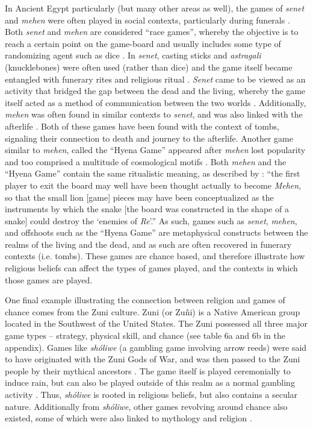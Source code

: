 \documentclass[%
	]{ijsra}
\begin{document}
In Ancient Egypt particularly (but many other areas as well), the games of \textit{senet} and \textit{mehen} were often played in social contexts, particularly during funerals \parencite[34]{kendall2007}. Both \textit{senet} and \textit{mehen} are considered ``race games”, whereby the objective is to reach a certain point on the game-board and usually includes some type of randomizing agent such as dice \parencite[3]{gobet2004}. In \textit{senet}, casting sticks and \textit{astragali} (knucklebones) were often used (rather than dice) and the game itself became entangled with funerary rites and religious ritual \parencites{piccione1980}[58]{piccione2007}. \textit{Senet} came to be viewed as an activity that bridged the gap between the dead and the living, whereby the game itself acted as a method of communication between the two worlds \parencites[59]{piccione2007}{robinson2015}. Additionally, \textit{mehen} was often found in similar contexts to \textit{senet}, and was also linked with the afterlife \parencite[40-41]{kendall2007}. Both of these games have been found with the context of tombs, signaling their connection to death and journey to the afterlife. Another game similar to \textit{mehen}, called the ``Hyena Game” appeared after \textit{mehen} lost popularity and too comprised a multitude of cosmological motifs \parencite[44]{kendall2007}. Both \textit{mehen} and the ``Hyena Game” contain the same ritualistic meaning, as described by \textcite[44]{kendall2007}: ``the first player to exit the board may well have been thought actually to become \textit{Mehen}, so that the small lion [game] pieces may have been conceptualized as the instruments by which the snake [the board was constructed in the shape of a snake] could destroy the ‘enemies of \textit{Re}’.” As such, games such as \textit{senet}, \textit{mehen}, and offshoots such as the ``Hyena Game” are metaphysical constructs between the realms of the living and the dead, and as such are often recovered in funerary contexts (i.e. tombs). These games are chance based, and therefore illustrate how religious beliefs can affect the types of games played, and the contexts in which those games are played. 

One final example illustrating the connection between religion and games of chance comes from the Zuni culture. Zuni (or Zu\~{n}i) is a Native American group located in the Southwest of the United States. The Zuni possessed all three major game types – strategy, physical skill, and chance (see  table 6a and 6b in the appendix). 
Games like \textit{sh\'{o}liwe} (a gambling game involving arrow reeds) were said to have originated with the Zuni Gods of War, and was then passed to the Zuni people by their mythical ancestors \parencite[480]{stevenson1903}. The game itself is played ceremonially to induce rain, but can also be played outside of this realm as a normal gambling activity \parencite[480]{stevenson1903}. Thus, \textit{sh\'{o}liwe} is rooted in religious beliefs, but also contains a secular nature. Additionally from \textit{sh\'{o}liwe}, other games revolving around chance also existed, some of which were also linked to mythology and religion \parencite{stevenson1903}. 
\end{document}
